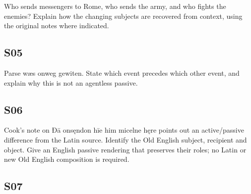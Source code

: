 \par\begin{minipage}{\linewidth}\raggedright
Who sends messengers to Rome, who sends the army, and who fights the enemies? Explain how the changing subjects are recovered from context, using the original notes where indicated.

\end{minipage}\par\addvspace{4pt}

\subsection*{S05}

\par\begin{minipage}{\linewidth}\raggedright
Parse wæs onweg gewiten. State which event precedes which other event, and explain why this is not an agentless passive.

\end{minipage}\par\addvspace{4pt}

\subsection*{S06}

\par\begin{minipage}{\linewidth}\raggedright
Cook’s note on Ðā onsęndon hīe him micelne hęre points out an active/\allowbreak{}passive difference from the Latin source. Identify the Old English subject, recipient and object. Give an English passive rendering that preserves their roles; no Latin or new Old English composition is required.

\end{minipage}\par\addvspace{4pt}

\subsection*{S07}

